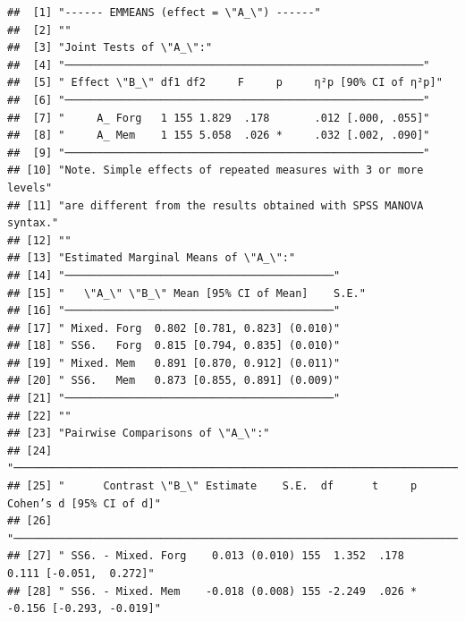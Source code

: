 \documentclass[
  man]{apa6}
\begin{document}
\begin{verbatim}
##  [1] "------ EMMEANS (effect = \"A_\") ------"                                            
##  [2] ""                                                                                   
##  [3] "Joint Tests of \"A_\":"                                                             
##  [4] "────────────────────────────────────────────────────────"                           
##  [5] " Effect \"B_\" df1 df2     F     p     η²p [90% CI of η²p]"                         
##  [6] "────────────────────────────────────────────────────────"                           
##  [7] "     A_ Forg   1 155 1.829  .178       .012 [.000, .055]"                           
##  [8] "     A_ Mem    1 155 5.058  .026 *     .032 [.002, .090]"                           
##  [9] "────────────────────────────────────────────────────────"                           
## [10] "Note. Simple effects of repeated measures with 3 or more levels"                    
## [11] "are different from the results obtained with SPSS MANOVA syntax."                   
## [12] ""                                                                                   
## [13] "Estimated Marginal Means of \"A_\":"                                                
## [14] "──────────────────────────────────────────"                                         
## [15] "   \"A_\" \"B_\" Mean [95% CI of Mean]    S.E."                                     
## [16] "──────────────────────────────────────────"                                         
## [17] " Mixed. Forg  0.802 [0.781, 0.823] (0.010)"                                         
## [18] " SS6.   Forg  0.815 [0.794, 0.835] (0.010)"                                         
## [19] " Mixed. Mem   0.891 [0.870, 0.912] (0.011)"                                         
## [20] " SS6.   Mem   0.873 [0.855, 0.891] (0.009)"                                         
## [21] "──────────────────────────────────────────"                                         
## [22] ""                                                                                   
## [23] "Pairwise Comparisons of \"A_\":"                                                    
## [24] "─────────────────────────────────────────────────────────────────────────────────"  
## [25] "      Contrast \"B_\" Estimate    S.E.  df      t     p     Cohen’s d [95% CI of d]"
## [26] "─────────────────────────────────────────────────────────────────────────────────"  
## [27] " SS6. - Mixed. Forg    0.013 (0.010) 155  1.352  .178      0.111 [-0.051,  0.272]"  
## [28] " SS6. - Mixed. Mem    -0.018 (0.008) 155 -2.249  .026 *   -0.156 [-0.293, -0.019]"  

\end{verbatim}
\end{document}
